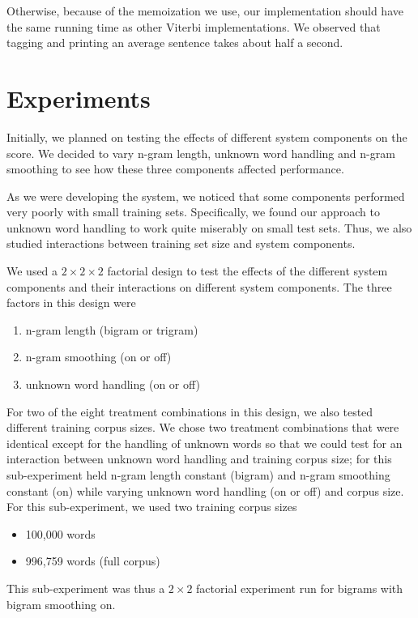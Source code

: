 \documentclass{article}
\begin{document}
Otherwise, because of the memoization we use, our implementation should have the
same running time as other Viterbi implementations.  We observed that tagging
and printing an average sentence takes about half a second.

\section{Experiments}
Initially, we planned on testing the effects of different system components
on the score. We decided to vary n-gram length, unknown word handling and
n-gram smoothing to see how these three components affected performance.

As we were developing the system, we noticed that some components performed
very poorly with small training sets. Specifically, we found our approach to
unknown word handling to work quite miserably on small test sets. Thus,
we also studied interactions between training set size and system components.

We used a $2\times2\times2$ factorial design to test the effects of the different
system components and their interactions on different system components.
The three factors in this design were
\begin{enumerate}
\item n-gram length (bigram or trigram)
\item n-gram smoothing (on or off)
\item unknown word handling (on or off)
\end{enumerate}
For two of the eight treatment combinations in this design, we also tested
different training corpus sizes. We chose two treatment combinations that were
identical except for the handling of unknown words so that we could test
for an interaction between unknown word handling and training corpus size;
for this sub-experiment held n-gram length constant (bigram) and n-gram
smoothing constant (on) while varying unknown word handling (on or off)
and corpus size. For this sub-experiment, we used two training corpus sizes
\begin{itemize}
\item 100,000 words
\item 996,759 words (full corpus)
\end{itemize}
This sub-experiment was thus a $2\times2$ factorial experiment run for
bigrams with bigram smoothing on.
\end{document}

